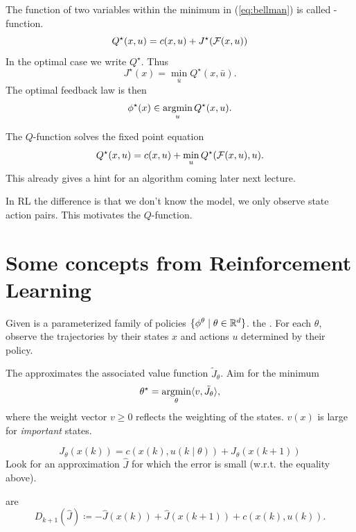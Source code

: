 \begin{definition}[Q-function]\label{def:1.14}
    The function of two variables within the minimum in (\ref{eq:bellman}) is called -function.
    \[Q^\star(x,u)=c(x,u)+J^\star(\mathcal{F}(x,u))\]
    In the optimal case we write \(Q^\star\). Thus 
    \[J^\star(x)=\min_{\bar{u}}Q^\star(x,\bar{u}).\] 
    The optimal feedback law is then 
    \[\phi^\star(x)\in\operatorname*{\text{argmin}}_{u}Q^\star(x,u).\]    
\end{definition} %

The \(Q\)-function solves the fixed point equation 
\[Q^\star(x,u)=c(x,u)+\min_{u}Q^\star(\mathcal{F}(x,u),u).\]
This already gives a hint for an algorithm coming later next lecture.

\begin{remark}
    In RL the difference is that we don't know the model, we only observe state action pairs.
    This motivates the \(Q\)-function.        
\end{remark}

\section*{Some concepts from Reinforcement Learning}


Given is a parameterized family of policies \(\{\phi^\theta\mid \theta\in \mathbb{R}^d\}\).
the . For each \(\theta\), observe the trajectories by their states 
\(x\) and actions \(u\) determined by their policy.

The  approximates the associated value function 
\(\tilde{J}_\theta\). Aim for the minimum 
\[\theta^\star=\operatorname*{\text{argmin}}_{\theta}\langle v, \tilde{J}_\theta \rangle,\]
where the weight vector \(v\geq 0\) reflects the weighting of the states. \(v(x)\) is large for \textit{important} states.


\[J_\theta(x(k))=c(x(k),u(k\mid\theta))+J_\theta(x(k+1))\]
Look for an approximation \(\hat{J}\) for which the error is small (w.r.t. the equality above).

 are 
\[D_{k+1}(\hat{J})\coloneqq -\hat{J}(x(k))+\hat{J}(x(k+1))+c(x(k),u(k)).\]

